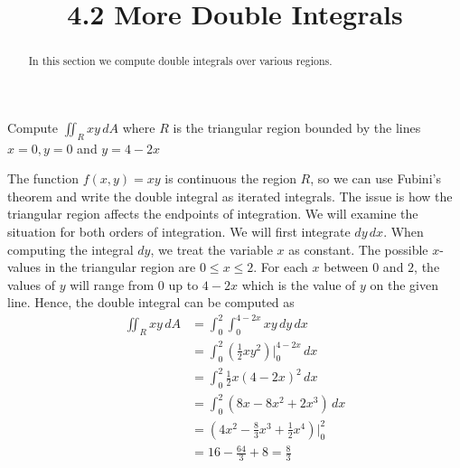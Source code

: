 \documentclass[handout]{ximera}
\title{4.2 More Double Integrals}
\begin{document}
\begin{abstract}
In this section we compute double integrals over various regions.
\end{abstract}
 
\maketitle




\begin{example}[Example 1]
Compute $\iint_R xy \, dA$ where $R$ is the triangular region bounded by the lines $x = 0, y = 0$ and $y = 4-2x$\\
\begin{image}
\end{image}

The function $f(x,y) = xy$ is continuous the region $R$, so we can use Fubini's theorem and write the double integral as iterated integrals.
The issue is how the triangular region affects the endpoints of integration. We will examine the situation for both orders of integration.
We will first integrate $dy\, dx$. When computing the integral $dy$, we treat the variable $x$ as constant. 
The possible $x$-values in the triangular region are $0 \leq x \leq 2$.  
For each $x$ between $0$ and $2$, the values of $y$ will range from $0$ up to $4 - 2x$ which is the value of $y$ on the given line.
Hence, the double integral can be computed as
\begin{align*}
\iint_R xy \, dA & = \int_0^2 \int_0^{4 - 2x} xy \, dy \, dx\\
                 & = \int_0^2 \left(\frac12 xy^2 \right) \bigg|_{0}^{4 - 2x} \, dx\\
                 & = \int_0^2 \frac12 x (4-2x)^2 \, dx\\
                 &=  \int_0^2 \left(8x - 8x^2 + 2x^3\right) \, dx\\
                 &= \left(4x^2 - \frac83 x^3 + \frac12 x^4 \right) \bigg|_0^2\\
                 &= 16 - \frac{64}{3} + 8 = \frac83
\end{align*}      
\begin{image}
\end{image}



\end{example}
\end{document}
